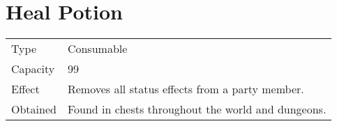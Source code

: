 \section{Heal Potion}
\label{item:heal_potion}


\noindent\begin{tabularx}{\textwidth}[l]{lX}
	Type
	& Consumable
\\
	Capacity
	& 99
\\
	Effect
	& Removes all status effects from a party member.
\\
	Obtained
	& Found in chests throughout the world and dungeons.
\end{tabularx}
